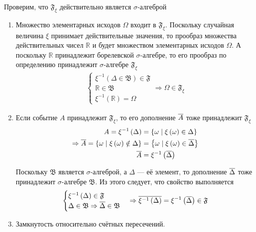 Проверим, что $\mathfrak{F}_\xi$ действительно является $\sigma$-алгеброй
\begin{enumerate}
    \item Множество элементарных исходов $\Omega$ входит в $\mathfrak{F}_\xi$.
        Поскольку случайная величина $\xi$ принимает действительные значения,
        то прообраз множества действительных чисел $\mathbb{R}$
        и будет множеством элементарных исходов $\Omega$.
        А поскольку $\mathbb{R}$ принадлежит борелевской $\sigma$-алгебре,
        то его прообраз по определению принадлежит
        $\sigma$-алгебре $\mathfrak{F}_\xi$
        \begin{align*}
            \begin{cases}
                \xi^{-1}\left( \Delta \in \mathfrak{B} \right) \in\mathfrak{F}\\
                \mathbb{R}\in\mathfrak{B}\\
                \xi^{-1}\left( \mathbb{R} \right)=\Omega
            \end{cases}
            \Rightarrow
            \Omega \in \mathfrak{F}_\xi
        \end{align*}
    \item Если событие $A$ принадлежит $\mathfrak{F}_\xi$,
        то его дополнение $\overline{A}$ тоже принадлежит $\mathfrak{F}_\xi$
        \begin{align*}
            A=\xi^{-1}\left( \Delta \right)
                &=\left\{ \omega \mid \xi\left( \omega \right)
                    \in \Delta \right\}\\
            \Rightarrow
            \overline{A}
                =\left\{ \omega \mid \xi\left( \omega \right)
                    \notin \Delta \right\}
                &=\left\{ \omega \mid \xi\left( \omega \right)
                    \in \overline{\Delta}\right\}\\
            \overline{A}&=\xi^{-1}\left( \overline{\Delta} \right)
        \end{align*}

        Поскольку $\mathfrak{B}$ является $\sigma$-алгеброй,
        а $\Delta$ --- её элемент,
        то дополнение $\overline{\Delta}$ тоже принадлежит
        $\sigma$-алгебре $\mathfrak{B}$.
        Из этого следует, что свойство выполняется
        \begin{align*}
            \begin{cases}
                \xi^{-1}\left( \Delta \right) \in \mathfrak{F}\\
                \Delta \in \mathfrak{B}
                    \Rightarrow \overline{\Delta} \in \mathfrak{B}
            \end{cases}
            \Rightarrow
            \overline{\xi^{-1}\left( \Delta \right)}
                =\xi^{-1}\left( \overline{\Delta} \right) \in \mathfrak{F}
        \end{align*}
    \item Замкнутость относительно счётных пересечений.


\end{enumerate}
